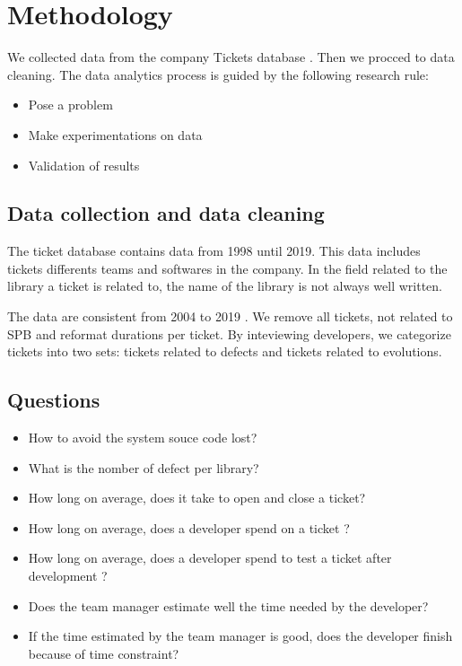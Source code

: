 \documentclass[10pt,conference]{IEEEtran}
\begin{document}
	\section{Methodology}\label{sec:methodology}
	We collected data  from the company Tickets database .  
	Then we procced to data cleaning.
	The data analytics process is guided by the following research rule:
	\begin{itemize}
	\item Pose a problem
	\item Make experimentations on data
	\item Validation of results
	\end{itemize}
	\subsection{Data collection and data cleaning}
	The ticket database contains data from 1998  until 2019. 
	This data includes tickets  differents teams and softwares in  the company. 
	In the field related to the  library a ticket is related to,  the name of the library is not always well written. 
	
	The  data are consistent  from 2004 to 2019 . 
	We  remove all tickets, not related  to SPB and reformat durations per ticket.
	By inteviewing developers, we categorize tickets into two sets: tickets related to defects and tickets related to evolutions.
	
	 \subsection{Questions}
	 \begin{itemize}
	 \item How to avoid the system souce code lost?
	 \item What is the nomber of defect per library?
	 \item How long on average, does it take to open and close a ticket?
	 \item How long on average,  does a developer spend on a ticket ?
	 \item How long on average, does a developer spend to test a ticket after development ?
	 \item Does the team manager estimate well  the time needed by the developer?
	 \item If the time estimated by the team manager is good, does the developer finish because  of time constraint?
	 \end{itemize}
	 
\end{document}

